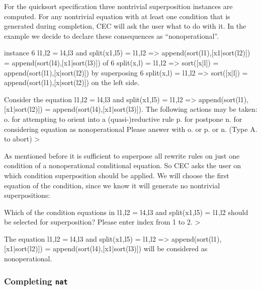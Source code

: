 For the quicksort specification three nontrivial superposition instances are
computed. For any nontrivial equation with at least one condition that is
generated during completion, CEC will ask the user what to do with it. In the
example we decide to declare these consequences as ``nonoperational''.

\begin{screen}
instance   6    l1,l2 = l4,l3 and split(x1,l5) = l1,l2 => 
                                     append(sort(l1),[x1|sort(l2)]) = 
                                     append(sort(l4),[x1|sort(l3)])
of        6    split(x,l) = l1,l2 => sort([x|l]) = 
                                     append(sort(l1),[x|sort(l2)])
by superposing
          6    split(x,l) = l1,l2 => sort([x|l]) = 
                                     append(sort(l1),[x|sort(l2)]) 
on the left side.

Consider the equation
        l1,l2 = l4,l3 and split(x1,l5) = l1,l2 => 
                                     append(sort(l1),[x1|sort(l2)]) = 
                                     append(sort(l4),[x1|sort(l3)]).
The following actions may be taken:
o. for attempting to orient into a (quasi-)reductive rule
p. for postpone
n. for considering equation as nonoperational
   Please answer with o. or p. or n. (Type A. to abort) >
\end{screen}

As mentioned before it is sufficient to superpose all rewrite rules
on just one condition of a nonoperational conditional equation. So
CEC asks the user on which condition superposition should be
applied. 
We will choose the first equation of the condition, since we know it
will generate no nontrivial superpositions:

\begin{screen}
Which of the condition equations in
        l1,l2 = l4,l3 and split(x1,l5) = l1,l2 
should be selected for superposition?
Please enter index from 1 to 2. > 

The equation l1,l2 = l4,l3 and split(x1,l5) = l1,l2 => 
                                          append(sort(l1),[x1|sort(l2)]) = 
                                          append(sort(l4),[x1|sort(l3)]) 
will be considered as nonoperational.
\end{screen}

\subsubsection{Completing {\tt nat}}

